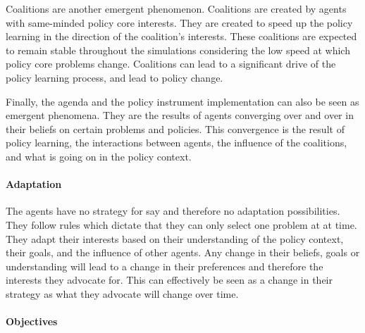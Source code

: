 Coalitions are another emergent phenomenon. Coalitions are created by agents with same-minded policy core interests. They are created to speed up the policy learning in the direction of the coalition's interests. These coalitions are expected to remain stable throughout the simulations considering the low speed at which policy core problems change. Coalitions can lead to a significant drive of the policy learning process, and lead to policy change.

Finally, the agenda and the policy instrument implementation can also be seen as emergent phenomena. They are the results of agents converging over and over in their beliefs on certain problems and policies. This convergence is the result of policy learning, the interactions between agents, the influence of the coalitions, and what is going on in the policy context.

\paragraph{Adaptation}

The agents have no strategy for say and therefore no adaptation possibilities. They follow rules which dictate that they can only select one problem at at time. They adapt their interests based on their understanding of the policy context, their goals, and the influence of other agents. Any change in their beliefs, goals or understanding will lead to a change in their preferences and therefore the interests they advocate for. This can effectively be seen as a change in their strategy as what they advocate will change over time.

\paragraph{Objectives}

